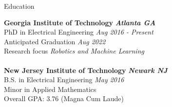 \documentclass{resume} %
\begin{document}

\begin{rSection}{Education}

{\bf Georgia Institute of Technology} \hfill {\bf \em Atlanta GA} \\ 
PhD in Electrical Engineering \hfill {\em Aug 2016 - Present}\\
Anticipated Graduation \hfill {\em Aug 2022}\\
Research focus \hfill {\em Robotics and Machine Learning}\\
\\
{\bf New Jersey Institute of Technology} \hfill {\bf \em Newark NJ} \\ 
B.S. in Electrical Engineering \hfill {\em May 2016}\\
Minor in Applied Mathematics \\
Overall GPA: 3.76 (Magna Cum Laude)

\end{rSection}
\end{document}
